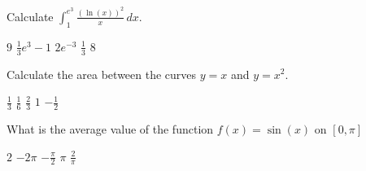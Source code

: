 \documentclass[11pt]{article}
\begin{document}
\begin{questions}
\begin{multiplechoice}{5}
\question Calculate $\int_1^{e^3} \frac{(\ln(x))^2}{x} \, dx$.
\begin{answers}{2}
\ans $9$ 
\ans $\frac{1}{3} e^{3} - 1$
\ans $2e^{-3}$
\ans $\frac{1}{3}$
\ans $8$
\end{answers}

\question Calculate the area between the curves $y = x$ and $y = x^2$.
\begin{answers}{3}
\ans $\frac 1 3$ 
\ans $\frac 1 6$ 
\ans $\frac 2 3$ 
\ans $1$ 
\ans $- \frac 1 2$ 
\end{answers}

\question What is the average value of the function $f(x) = \sin(x)$ on $[0, \pi]$
\begin{answers}{3}
\ans $2$
\ans $-2\pi$
\ans $-\frac{\pi}{2}$
\ans $\pi$
\ans $\frac{2}{\pi}$
\end{answers}

\end{multiplechoice}
\end{questions}
\end{document}
